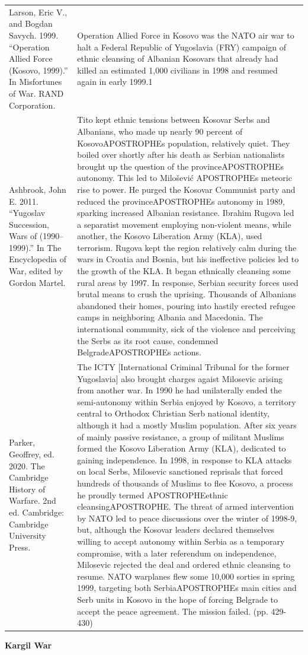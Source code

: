 {\begin{longtable}{p{}p{}}
\\
Larson, Eric V., and Bogdan Savych. 1999. “Operation Allied Force (Kosovo, 1999).” In Misfortunes of War. RAND Corporation. & Operation Allied Force in Kosovo was the NATO air war to halt a Federal Republic of Yugoslavia (FRY) campaign of ethnic cleansing of Albanian Kosovars that already had killed an estimated 1,000 civilians in 1998 and resumed again in early 1999.1
\\
Ashbrook, John E. 2011. “Yugoslav Succession, Wars of (1990–1999).” In The Encyclopedia of War, edited by Gordon Martel. & Tito kept ethnic tensions between Kosovar Serbs and Albanians, who made up nearly 90 percent of KosovoAPOSTROPHEs population, relatively quiet. They boiled over shortly after his death as Serbian nationalists brought up the question of the provinceAPOSTROPHEs autonomy. This led to Milošević APOSTROPHEs meteoric rise to power. He purged the Kosovar Communist party and reduced the provinceAPOSTROPHEs autonomy in 1989, sparking increased Albanian resistance. Ibrahim Rugova led a separatist movement employing non-violent means, while another, the Kosovo Liberation Army (KLA), used terrorism. Rugova kept the region relatively calm during the wars in Croatia and Bosnia, but his ineffective policies led to the growth of the KLA. It began ethnically cleansing some rural areas by 1997. In response, Serbian security forces used brutal means to crush the uprising. Thousands of Albanians abandoned their homes, pouring into hastily erected refugee camps in neighboring Albania and Macedonia. The international community, sick of the violence and perceiving the Serbs as its root cause, condemned BelgradeAPOSTROPHEs actions.
\\
Parker, Geoffrey, ed. 2020. The Cambridge History of Warfare. 2nd ed. Cambridge: Cambridge University Press. & The ICTY [International Criminal Tribunal for the former Yugoslavia] also brought charges agaist Milosevic arising from another war. In 1990 he had unilaterally ended the semi-autonomy within Serbia enjoyed by Kosovo, a territory central to Orthodox Christian Serb national identity, although it had a mostly Muslim population. After six years of mainly passive resistance, a group of militant Muslims formed the Kosovo Liberation Army (KLA), dedicated to gaining independence. In 1998, in response to KLA attacks on local Serbs, Milosevic sanctioned reprisals that forced hundreds of thousands of Muslims to flee Kosovo, a process he proudly termed APOSTROPHEethnic cleansingAPOSTROPHE. The threat of armed intervention by NATO led to peace discussions over the winter of 1998-9, but, although the Kosovar leaders declared themselves willing to accept autonomy within Serbia as a temporary compromise, with a later referendum on independence, Milosevic rejected the deal and ordered ethnic cleansing to resume. NATO warplanes flew some 10,000 sorties in spring 1999, targeting both SerbiaAPOSTROPHEs main cities and Serb units in Kosovo in the hope of forcing Belgrade to accept the peace agreement. The mission failed. (pp. 429-430)
\\
\end{longtable}}
\clearpage
         \textbf{Kargil War} 

